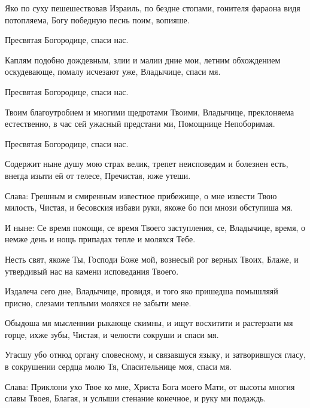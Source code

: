 \begin{mymulticols}
 




 Яко по суху пешешествовав Израиль, по бездне стопами, гонителя фараона видя потопляема, Богу победную песнь поим, вопияше. 

 Пресвятая Богородице, спаси нас. 

Каплям подобно дождевным, злии и малии дние мои, летним обхождением оскудевающе, помалу исчезают уже, Владычице, спаси мя. 

 Пресвятая Богородице, спаси нас. 

Твоим благоутробием и многими щедротами Твоими, Владычице, преклоняема естественно, в час сей ужасный предстани ми, Помощнице Непоборимая. 

 Пресвятая Богородице, спаси нас. 

Содержит ныне душу мою страх велик, трепет неисповедим и болезнен есть, внегда изыти ей от телесе, Пречистая, юже утеши. 

Слава: Грешным и смиренным известное прибежище, о мне извести Твою милость, Чистая, и бесовския избави руки, якоже бо пси мнози обступиша мя. 

И ныне: Се время помощи, се время Твоего заступления, се, Владычице, время, о немже день и нощь припадах тепле и моляхся Тебе.




 Несть свят, якоже Ты, Господи Боже мой, вознесый рог верных Твоих, Блаже, и утвердивый нас на камени исповедания Твоего. 

Издалеча сего дне, Владычице, провидя, и того яко пришедша помышляяй присно, слезами теплыми моляхся не забыти мене. 

Обыдоша мя мысленнии рыкающе скимны, и ищут восхитити и растерзати мя горце, ихже зубы, Чистая, и челюсти сокруши и спаси мя. 

Угасшу убо отнюд органу словесному, и связавшуся языку, и затворившуся гласу, в сокрушении сердца молю Тя, Спасительнице моя, спаси мя. 

Слава: Приклони ухо Твое ко мне, Христа Бога моего Мати, от высоты многия славы Твоея, Благая, и услыши стенание конечное, и руку ми подаждь. 


\end{mymulticols}
